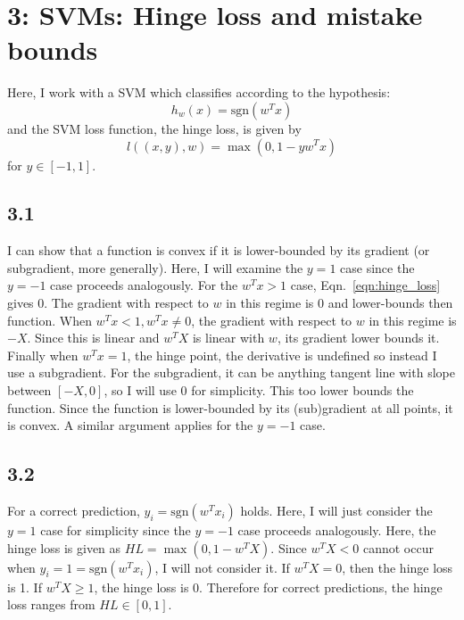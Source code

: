 \documentclass[12pt]{amsart}
\begin{document}
\section*{3: SVMs: Hinge loss and mistake bounds}

Here, I work with a SVM which classifies according to the hypothesis:
\begin{equation} \label{eqn:svm}
h_w(x) = \text{sgn}(w^Tx)
\end{equation}
and the SVM loss function, the hinge loss, is given by
\begin{equation} \label{eqn:hinge_loss}
l((x,y),w) = \max(0,1 - yw^Tx)
\end{equation}
for $y \in [-1,1]$.

\subsection*{3.1}

I can show that a function is convex if it is lower-bounded by its gradient (or subgradient, more generally).  Here, I will examine the $y = 1$ case since the $y = -1$ case proceeds analogously.   For the $w^Tx > 1$ case, Eqn.~\ref{eqn:hinge_loss} gives 0.  The gradient with respect to $w$ in this regime is 0 and lower-bounds then function.  When $w^Tx < 1, w^Tx \neq 0$, the gradient with respect to $w$ in this regime is $-X$.  Since this is linear and $w^TX$ is linear with $w$, its gradient lower bounds it.  Finally when $w^Tx = 1$, the hinge point, the derivative is undefined so instead I use a subgradient.  For the subgradient, it can be anything tangent line with slope between $[-X,0]$, so I will use 0 for simplicity.  This too lower bounds the function.  Since the function is lower-bounded by its (sub)gradient at all points, it is convex.  A similar argument applies for the $y = -1$ case.

\subsection*{3.2}
For a correct prediction, $y_i = \text{sgn}(w^Tx_i)$ holds.  Here, I will just consider the $y = 1$ case for simplicity since the $y = -1$ case proceeds analogously.  Here, the hinge loss is given as $HL = \max(0,1-w^TX)$.  Since $w^TX < 0$ cannot occur when $y_i = 1 = \text{sgn}(w^Tx_i)$, I will not consider it.  If $w^TX = 0$, then the hinge loss is 1.  If $w^TX \geq 1$, the hinge loss is 0.  Therefore for correct predictions, the hinge loss ranges from $HL \in [0,1]$.
\end{document}
